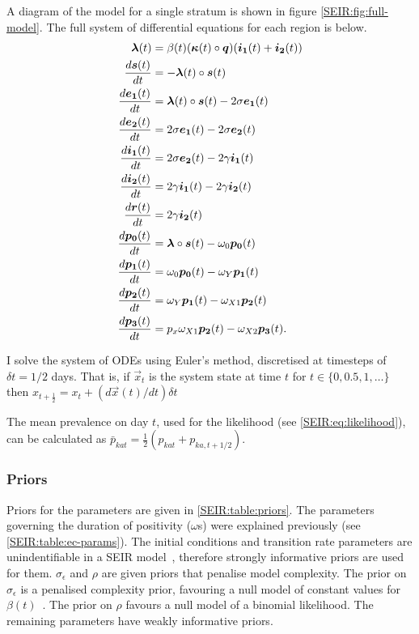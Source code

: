 \documentclass[thesis.tex]{subfiles}
\begin{document}
A diagram of the model for a single stratum is shown in figure \cref{SEIR:fig:full-model}.
The full system of differential equations for each region is below.
\begin{align}
    \label{SEIR:eq:fullODEs}
    \bm{\lambda}(t) &= \beta(t) (\bm{\kappa}(t) \circ \bm{q}) (\bm{i_1}(t) + \bm{i_2}(t)) \\
    \frac{d\bm{s}(t)}{dt} &= -\bm{\lambda}(t) \circ \bm{s}(t) \\
    \frac{d\bm{e_1}(t)}{dt} &= \bm{\lambda}(t) \circ \bm{s}(t) - 2\sigma \bm{e_1}(t) \\
    \frac{d\bm{e_2}(t)}{dt} &= 2\sigma \bm{e_1}(t) - 2\sigma \bm{e_2}(t) \\
    \frac{d\bm{i_1}(t)}{dt} &= 2\sigma \bm{e_2}(t) - 2\gamma \bm{i_1}(t) \\
    \frac{d\bm{i_2}(t)}{dt} &= 2\gamma \bm{i_1}(t) - 2\gamma \bm{i_2}(t) \\
    \frac{d\bm{r}(t)}{dt} &= 2\gamma \bm{i_2}(t) \\
    \frac{d\bm{p_0}(t)}{dt} &= \bm{\lambda} \circ \bm{s}(t) - \omega_0 \bm{p_0}(t) \\
    \frac{d\bm{p_1}(t)}{dt} &= \omega_0 \bm{p_0}(t) - \omega_Y \bm{p_1}(t) \\
    \frac{d\bm{p_2}(t)}{dt} &= \omega_Y \bm{p_1}(t) - \omega_{X1} \bm{p_2}(t) \\
    \frac{d\bm{p_3}(t)}{dt} &= p_x \omega_{X1} \bm{p_2}(t) - \omega_{X2} \bm{p_3}(t).
\end{align}

I solve the system of ODEs using Euler's method, discretised at timesteps of $\delta t = 1/2$ days.
That is, if $\vec{x}_t$ is the system state at time $t$ for $t \in \{ 0, 0.5, 1, \dots \}$ then $x_{t+\frac{1}{2}} = x_t + (d\vec{x}(t)/dt) \delta t$

The mean prevalence on day $t$, used for the likelihood (see \cref{SEIR:eq:likelihood}), can be calculated as $\bar{p}_{kat} = \frac{1}{2} ( p_{kat} + p_{ka,t+1/2} )$.

\subsubsection{Priors} \label{SEIR:sec:priors}

Priors for the parameters are given in \cref{SEIR:table:priors}.
The parameters governing the duration of positivity ($\omega$s) were explained previously (see \cref{SEIR:table:ec-params}).
The initial conditions and transition rate parameters are unindentifiable in a SEIR model~\autocite{dankwaStructural}, therefore strongly informative priors are used for them.
$\sigma_\epsilon$ and $\rho$ are given priors that penalise model complexity.
The prior on $\sigma_\epsilon$ is a penalised complexity prior, favouring a null model of constant values for $\beta(t)$~\autocite{simpsonPenalising}.
The prior on $\rho$ favours a null model of a binomial likelihood.
The remaining parameters have weakly informative priors.
\end{document}
